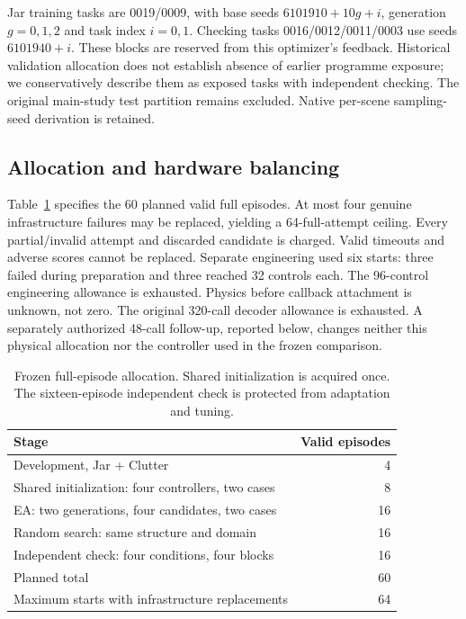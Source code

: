 \documentclass[sigconf,dvipsnames,balance=false]{acmart}
\begin{document}
Jar training tasks are 0019/0009, with base seeds $6101910+10g+i$, generation
$g=0,1,2$ and task index $i=0,1$. Checking tasks 0016/0012/0011/0003 use seeds
$6101940+i$. These blocks are reserved from this optimizer's feedback. Historical
validation allocation does not establish absence of earlier programme exposure;
we conservatively describe them as exposed tasks with independent checking.
The original main-study test partition remains excluded. Native per-scene
sampling-seed derivation is retained.

\subsection{Allocation and hardware balancing}
Table~\ref{tab:allocation} specifies the 60 planned valid full episodes. At most
four genuine infrastructure failures may be replaced, yielding a 64-full-attempt
ceiling. Every partial/invalid attempt and discarded candidate is charged. Valid
timeouts and adverse scores cannot be replaced. Separate engineering used six
starts: three failed during preparation and three reached 32 controls each.
The 96-control engineering allowance is exhausted. Physics before callback
attachment is unknown, not zero. The original 320-call decoder allowance is
exhausted. A separately authorized 48-call follow-up, reported below, changes
neither this physical allocation nor the controller used in the frozen comparison.

\begin{table}[t]
\caption{Frozen full-episode allocation. Shared initialization is acquired once.
The sixteen-episode independent check is protected from adaptation and tuning.}
\label{tab:allocation}
\begin{tabular}{@{}p{\dimexpr\columnwidth-65pt\relax}r@{}}
\toprule
Stage & Valid episodes \\
\midrule
Development, Jar + Clutter & 4 \\
Shared initialization: four controllers, two cases & 8 \\
EA: two generations, four candidates, two cases & 16 \\
Random search: same structure and domain & 16 \\
Independent check: four conditions, four blocks & 16 \\
\midrule
Planned total & 60 \\
Maximum starts with infrastructure replacements & 64 \\
\bottomrule
\end{tabular}
\end{table}
\end{document}
